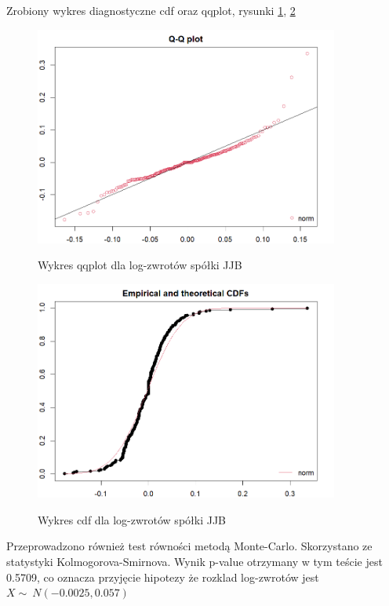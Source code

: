 \documentclass[a4paper,11pt]{article}
\begin{document}
Zrobiony wykres diagnostyczne cdf oraz qqplot, rysunki \ref{fig:jjb_qqplot_log}, \ref{fig:jjb_cdf_log.png}

\begin{figure}[htb]
	\centering
	\includegraphics[width=10cm]{jjb_qqplot_log.png}
        \label{fig:jjb_qqplot_log}
	\caption{Wykres qqplot dla log-zwrotów spółki JJB}
\end{figure}

\begin{figure}[htb]
	\centering
	\includegraphics[width=10cm]{jjb_cdf_log.png}
        \label{fig:jjb_cdf_log.png}
	\caption{Wykres cdf dla log-zwrotów spółki JJB}
\end{figure}

Przeprowadzono również test równości metodą Monte-Carlo. Skorzystano ze statystyki Kolmogorova-Smirnova. Wynik p-value otrzymany w tym teście jest 0.5709, co oznacza przyjęcie hipotezy że rozklad log-zwrotów jest  $X \sim\  N(-0.0025,0.057 )$
\end{document}
